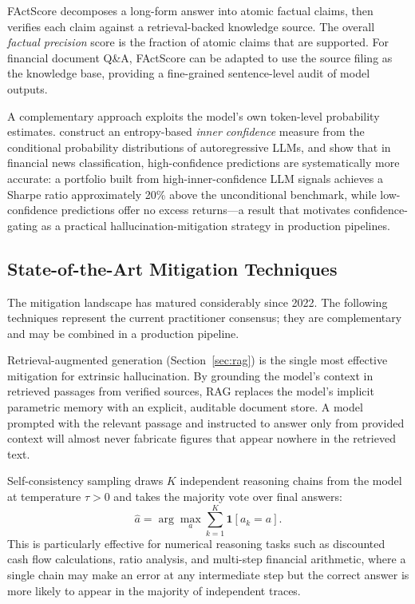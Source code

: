 \begin{context}
FActScore \citep{min2023factscore} decomposes a long-form answer into atomic factual
claims, then verifies each claim against a retrieval-backed knowledge source.  The
overall \emph{factual precision} score is the fraction of atomic claims that are
supported.  For financial document Q\&A, FActScore can be adapted to use the source
filing as the knowledge base, providing a fine-grained sentence-level audit of model
outputs.

A complementary approach exploits the model's own token-level probability estimates.
\citet{chen2024uncertainty} construct an entropy-based \emph{inner confidence} measure
from the conditional probability distributions of autoregressive LLMs, and show that
in financial news classification, high-confidence predictions are systematically more
accurate: a portfolio built from high-inner-confidence LLM signals achieves a Sharpe
ratio approximately 20\% above the unconditional benchmark, while low-confidence
predictions offer no excess returns---a result that motivates confidence-gating as a
practical hallucination-mitigation strategy in production pipelines.

\subsection{State-of-the-Art Mitigation Techniques}
\label{sec:hallucinations-mitigation}

The mitigation landscape has matured considerably since 2022.  The following techniques
represent the current practitioner consensus; they are complementary and may be
combined in a production pipeline.

Retrieval-augmented generation (Section~\ref{sec:rag}) is the single most effective
mitigation for extrinsic hallucination.  By grounding the model's context in retrieved
passages from verified sources, RAG replaces the model's implicit parametric memory
with an explicit, auditable document store.  A model prompted with the relevant passage
and instructed to answer only from provided context will almost never fabricate figures
that appear nowhere in the retrieved text.

Self-consistency sampling \citep{wang2022selfconsistency} draws $K$ independent
reasoning chains from the model at temperature $\tau > 0$ and takes the majority vote
over final answers:
\begin{equation}
  \hat{a} = \arg\max_{a} \sum_{k=1}^{K} \mathbf{1}[a_k = a].
  \label{eq:self-consistency}
\end{equation}
This is particularly effective for numerical reasoning tasks such as discounted cash
flow calculations, ratio analysis, and multi-step financial arithmetic, where a single
chain may make an error at any intermediate step but the correct answer is more likely
to appear in the majority of independent traces.


\end{context}

